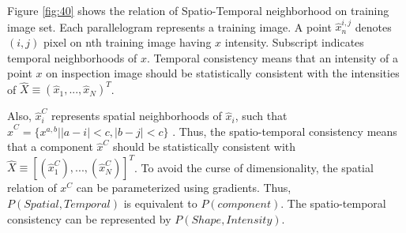 \documentclass[conference]{IEEEtran}
\begin{document}
Figure \ref{fig:40} shows the relation of Spatio-Temporal neighborhood on training image set. Each parallelogram represents a training image. A point \begin{math} \hat{x}_n^{i,j} \end{math}  denotes \begin{math} (i, j) \end{math} pixel on nth training image having \begin{math} x \end{math} intensity. Subscript indicates temporal neighborhoods of \begin{math} x \end{math}. Temporal consistency means that an intensity of a point \begin{math} x \end{math} on inspection image should be statistically consistent with the intensities of \begin{math} \hat{X} \equiv ( \hat{x}_1, ..., \hat{x}_N)^T \end{math}. 

Also, \begin{math} \hat{x}_i^C \end{math} represents spatial neighborhoods of \begin{math} \hat{x}_i \end{math}, such that \begin{math} \hat{x}^C = \{ x^{a,b} | |a-i| < c, | b - j | < c \} \end{math} . Thus, the spatio-temporal consistency means that a component  \begin{math} \hat{x}^C \end{math}  should be statistically consistent with  \begin{math} \hat{X} \equiv [( \hat{x}_1^C), ..., (\hat{x}_N^C) ]^T \end{math}. To avoid the curse of dimensionality, the spatial relation of \begin{math} x^C \end{math} can be parameterized using gradients. Thus, \begin{math} P(Spatial,Temporal) \end{math} is equivalent to \begin{math} P(component) \end{math}. The spatio-temporal consistency can be represented by \begin{math} P(Shape, Intensity) \end{math}. 
\end{document}
